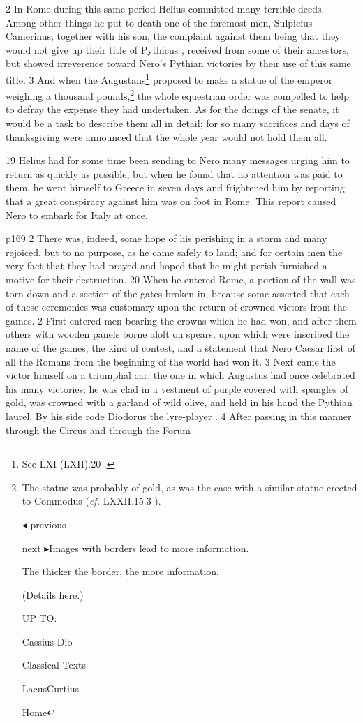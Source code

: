 2
In Rome during this same period Helius committed many terrible deeds. Among other things he put to death one of the foremost men, Sulpicius Camerinus, together with his son, the complaint against them being that they would not give up their title of Pythicus , received from some of their ancestors, but showed irreverence toward Nero's Pythian victories by their use of this same title. 3 And when the Augustans\texthebrew{⁠}\footnote{See LXI (LXII).20 .

} proposed to make a statue of the emperor weighing a thousand pounds,\texthebrew{⁠}\footnote{The statue was probably of gold, as was the case with a similar statue erected to Commodus (\emph{cf.} LXXII.15.3 ).

\texthebrew{◂} previous

next \texthebrew{▸}Images with borders lead to more information.

The thicker the border, the more information.

(Details here.)

UP TO:

Cassius Dio

Classical Texts

LacusCurtius

Home} the whole equestrian order was compelled to help to defray the expense they had undertaken. As for the doings of the senate, it would be a task to describe them all in detail; for so many sacrifices and days of thanksgiving were announced that the whole year would not hold them all.

19
Helius had for some time been sending to Nero many messages urging him to return as quickly as possible, but when he found that no attention was paid to them, he went himself to Greece in seven days and frightened him by reporting that a great conspiracy against him was on foot in Rome. This report caused Nero to embark for Italy at once.

p169 2 There was, indeed, some hope of his perishing in a storm and many rejoiced, but to no purpose, as he came safely to land; and for certain men the very fact that they had prayed and hoped that he might perish furnished a motive for their destruction. 20 When he entered Rome, a portion of the wall was torn down and a section of the gates broken in, because some asserted that each of these ceremonies was customary upon the return of crowned victors from the games. 2 First entered men bearing the crowns which he had won, and after them others with wooden panels borne aloft on spears, upon which were inscribed the name of the games, the kind of contest, and a statement that Nero Caesar first of all the Romans from the beginning of the world had won it. 3 Next came the victor himself on a triumphal car, the one in which Augustus had once celebrated his many victories; he was clad in a vestment of purple covered with spangles of gold, was crowned with a garland of wild olive, and held in his hand the Pythian laurel. By his side rode Diodorus the lyre-player . 4 After passing in this manner through the Circus and through the Forum

